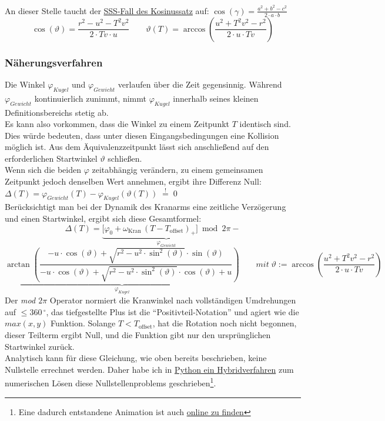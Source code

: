 An dieser Stelle taucht der \href{https://de.wikipedia.org/wiki/Kosinussatz#SSS-Fall}{SSS-Fall des Kosinussatz} auf: $\cos(\gamma) = \tfrac{a^2 + b^2 - c^2}{2\cdot a\cdot b}$
\[
\cos(\vartheta) = \frac{r^2 - u^2 - T^2 v^2}{2\cdot T v \cdot u}
\qquad \vartheta(T) = \arccos\left(\frac{u^2 + T^2 v^2 - r^2}{2 \cdot u\cdot T v}\right)
\]
\subsubsection{Näherungsverfahren}
Die Winkel $\varphi_{Kugel}$ und $\varphi_{Gewicht}$ verlaufen über die Zeit gegensinnig. Während $\varphi_{Gewicht}$ kontinuierlich zunimmt, nimmt $\varphi_{Kugel}$ innerhalb seines kleinen Definitionsbereichs stetig ab. 
\\
Es kann also vorkommen, dass die Winkel zu einem Zeitpunkt $T$ identisch sind. Dies würde bedeuten, dass unter diesen Eingangsbedingungen eine Kollision möglich ist. Aus dem Äquivalenzzeitpunkt lässt sich anschließend auf den erforderlichen Startwinkel $\vartheta$ schließen. 
\\
Wenn sich die beiden $\varphi$ zeitabhängig verändern, zu einem gemeinsamen Zeitpunkt jedoch denselben Wert annehmen, ergibt ihre Differenz Null: 
\\
$\Delta(T) = \varphi_{Gewicht}(T) - \varphi_{Kugel}(\vartheta(T)) \; \overset{!}{=} \; 0$ 
\\
Berücksichtigt man bei der Dynamik des Kranarms eine zeitliche Verzögerung und einen Startwinkel, ergibt sich diese Gesamtformel:
\\
\[
\Delta(T) = \underbrace{\bigl[\varphi_0 + \omega_{\text{Kran}}\,(T - T_{\text{offset}})_+\bigr] \bmod 2\pi}_{\varphi_{Gewicht}} -
\]
\[
 \underbrace{\arctan\left(\frac{-u\cdot \cos(\vartheta)+\sqrt{r^2 - u^2 \cdot \sin^2(\vartheta)}\cdot \sin(\vartheta)}{-u\cdot \cos(\vartheta)+\sqrt{r^2 - u^2 \cdot \sin^2(\vartheta)}\cdot \cos(\vartheta) + u}\right)
}_{\varphi_{Kugel}}
\qquad mit \; \vartheta := \arccos\left(\frac{u^2 + T^2 v^2 - r^2}{2 \cdot u\cdot T v}\right)
\]
Der \textit{mod $2 \pi$} Operator normiert die Kranwinkel nach vollständigen Umdrehungen auf $\leq 360\,^{\circ}$, das tiefgestellte Plus ist die \enquote{Positivteil-Notation} und agiert wie die $max(x,y)$ Funktion. Solange $T < T_{\text{offset}}$, hat die Rotation noch nicht begonnen, dieser Teilterm ergibt Null, und die Funktion gibt nur den ursprünglichen Startwinkel zurück. 
\\
Analytisch kann für diese Gleichung, wie oben bereits beschrieben, keine Nullstelle errechnet werden. Daher habe ich in \href{https://github.com/grn-x/sc-analysis/blob/main/scripts/pythonProject/newton_raphson.py}{Python ein Hybridverfahren} zum numerischen Lösen diese Nullstellenproblems geschrieben\footnote{Eine dadurch entstandene Animation ist auch \hyperref[https://github.com/grn-x/sc-analysis/blob/main/scripts/pythonProject/kugel_kran_animation.gif]{online zu finden}}. %

